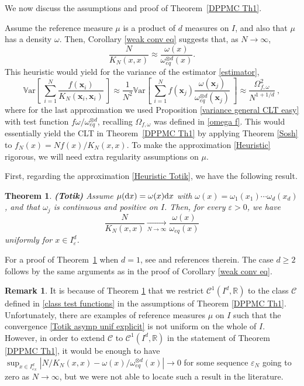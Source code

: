\documentclass[a4paper,11pt]{article}
\numberwithin{equation}{section}
\newtheorem{theorem}{Theorem}[]
\theoremstyle{definition}
\newtheorem{Remark}[]{Remark}
\newenvironment{remark}{\begin{Remark}\rm}{\end{Remark}}
\newcommand{\eq}{\begin{equation}}
\newcommand{\qe}{\end{equation}}
\newcommand{\R}{\mathbb{R}}
\newcommand{\bv}{\mathbf}
\newcommand{\Var}{\mathbb{V}{\mathrm{ar}}}
\renewcommand{\geq}{\geqslant}
\renewcommand{\epsilon}{\varepsilon}
\renewcommand{\d}{ {\rm d}}
\begin{document}
We now discuss the assumptions and proof of Theorem~\ref{DPPMC Th1}.

Assume  the reference measure $\mu$ is a product of $d$ measures on $I$, and also that  $\mu$ has a density $\omega$. Then, Corollary \ref{weak conv eq} suggests that, as $N\to\infty$,
\eq
\label{Heuristic Totik}
\frac N{K_N(x,x)}\approx \frac{\omega(x)}{\omega_{eq}^{\otimes d}(x)}.
\qe
This heuristic would yield for the variance of the estimator \eqref{estimator},
\eq
\label{Heuristic}
\Var\left[\ \sum_{i=1}^N \frac{f(\bv x_i)}{K_N(\bv x_i,\bv x_i)} \ \right]\approx \frac1{N^2}\Var\left[\ \sum_{i=1}^N  f(\bv x_j)\frac{\omega(\bv x_j)}{\omega_{eq}^{\otimes d}(\bv x_j)} \ \right]\approx \frac{\Omega_{f,\omega}^2}{N^{1+1/d}}\ ,
\qe
where for the last approximation we used Proposition \ref{variance general CLT easy} with test function $f\omega/\omega_{eq}^{\otimes d}$, recalling $\Omega_{f,\omega}$ was defined in \eqref{omega f}. This would essentially yield the CLT in Theorem~\ref{DPPMC Th1} by applying Theorem \ref{Sosh} to $f_N(x)=Nf(x)/K_N(x,x)$. To make the approximation \eqref{Heuristic} rigorous, we will need extra regularity assumptions on $\mu$.

First, regarding the approximation \eqref{Heuristic Totik}, we have the following result.

\begin{theorem}{\bf (Totik)}
\label{Totik asymp unif}
Assume $\mu(\d x)=\omega(x)\d x$ with $\omega(x)=\omega_1(x_1)\cdots\omega_d(x_d)$, and that $\omega_j$ is continuous and positive on $I$. Then, for every $\epsilon>0$, we have
\eq
\label{Totik asymp unif explicit}
\frac N{K_N(x,x)} \xrightarrow[N\to\infty]{} \frac{\omega(x)}{\omega_{eq}(x)}
\qe
uniformly  for $x\in I^d_\epsilon$.
\end{theorem}

For a proof of Theorem~\ref{Totik asymp unif} when $d=1$, see \cite[Section 3.11]{Sim11} and
references therein. The case $d\geq 2$ follows by the same arguments as in the proof of Corollary \ref{weak conv eq}.

\begin{remark} It is because of Theorem \ref{Totik asymp unif} that we restrict
  $\mathscr C^1(I^d,\R)$  to the class $\mathscr C$ defined in \eqref{class test
    functions} in the assumptions of Theorem \ref{DPPMC Th1}. Unfortunately,
  there are examples of reference measures $\mu$ on $I$ such that the
  convergence \eqref{Totik asymp unif explicit} is not uniform on the whole of
  $I$. However, in order to extend $\mathscr C$ to $\mathscr C^1(I^d,\R)$ in the
  statement of Theorem \ref{DPPMC Th1}, it would be enough to have  $\sup_{x\in
    I^d_{\epsilon_N}}|N/K_N(x,x) - \omega(x)/\omega_{eq}^{\otimes d}(x)|\to 0$
  for some sequence $\epsilon_N$ going to zero as $N\to\infty$, but we were not
  able to locate such a result in the literature.
\end{remark}
\end{document}
